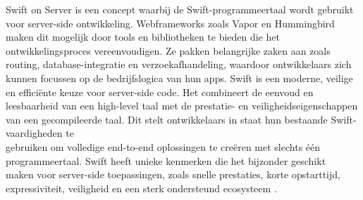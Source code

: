Swift on Server is een concept waarbij de Swift-programmeertaal wordt gebruikt voor server-side ontwikkeling. Webframeworks zoals Vapor en Hummingbird \\maken dit mogelijk door tools en bibliotheken te bieden die het ontwikkelingsproces vereenvoudigen. Ze pakken belangrijke zaken aan zoals routing, database-integratie en verzoekafhandeling, waardoor ontwikkelaars zich kunnen focussen op de bedrijfslogica van hun apps.
Swift is een moderne, veilige en efficiënte keuze voor server-side code. Het combineert de eenvoud en leesbaarheid van een high-level taal met de prestatie- en veiligheidseigenschappen van een gecompileerde taal. Dit stelt ontwikkelaars in staat hun bestaande Swift-vaardigheden te \\gebruiken om volledige end-to-end oplossingen te creëren met slechts één \\programmeertaal. Swift heeft unieke kenmerken die het bijzonder geschikt \\maken voor server-side toepassingen, zoals snelle prestaties, korte opstarttijd, \\expressiviteit, veiligheid en een sterk ondersteund ecosysteem \autocite{2022}.


